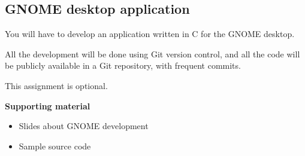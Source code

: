 \documentclass[a4paper]{article}
\begin{document}
\subsection{GNOME desktop application}
\label{sub:gnome}

You will have to develop an application written in C for the GNOME
desktop.

All the development will be done using Git version control, and all
the code will be publicly available in a Git repository, with frequent
commits.

This assignment is optional.


\textbf{Supporting material}

\begin{itemize}
\item Slides about GNOME development
\item Sample source code
\end{itemize}


\end{document}
